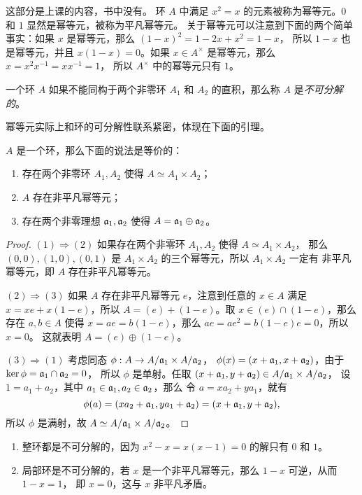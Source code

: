 这部分是上课的内容，书中没有。
环 $A$ 中满足 $x^2=x$ 的元素被称为幂等元。$0$ 和 $1$ 显然是幂等元，被称为平凡幂等元。
关于幂等元可以注意到下面的两个简单事实：如果 $x$ 是幂等元，那么 $(1-x)^2=1-2x+x^2=1-x$，
所以 $1-x$ 也是幂等元，并且 $x(1-x)=0$。如果 $x\in A^\times$ 是幂等元，那么 $x=x^2x^{-1}=xx^{-1}=1$，
所以 $A^\times$ 中的幂等元只有 $1$。

\begin{definition}
  一个环 $A$ 如果不能同构于两个非零环 $A_1$ 和 $A_2$ 的直积，那么称
  $A$ 是\emph{不可分解的}。
\end{definition}

幂等元实际上和环的可分解性联系紧密，体现在下面的引理。

\begin{lemma}
  $A$ 是一个环，那么下面的说法是等价的：
  \begin{enumerate}
    \item 存在两个非零环 $A_1,A_2$ 使得 $A\simeq A_1\times A_2$；
    \item $A$ 存在非平凡幂等元；
    \item 存在两个非零理想 $\mathfrak{a}_1,\mathfrak{a}_2$ 使得 $A=\mathfrak{a}_1\oplus\mathfrak{a}_2$。
  \end{enumerate}
\end{lemma}
\begin{proof}
  $(1)\Rightarrow (2)$ 如果存在两个非零环 $A_1,A_2$ 使得 $A\simeq A_1\times A_2$，
  那么 $(0,0),(1,0),(0,1)$ 是 $A_1\times A_2$ 的三个幂等元，所以 $A_1\times A_2$ 一定有
  非平凡幂等元，即 $A$ 存在非平凡幂等元。

  $(2)\Rightarrow (3)$ 如果 $A$ 存在非平凡幂等元 $e$，注意到任意的 $x\in A$ 满足
  $x=xe+x(1-e)$，所以 $A=(e)+(1-e)$。取 $x\in (e)\cap (1-e)$，那么存在
  $a,b\in A$ 使得 $x=ae=b(1-e)$，那么 $ae=ae^2=b(1-e)e=0$，所以 $x=0$。
  这就表明 $A=(e)\oplus (1-e)$。

  $(3)\Rightarrow (1)$ 考虑同态 $\phi:A\to A/\mathfrak{a}_1\times A/\mathfrak{a}_2$，
  $\phi(x)=(x+\mathfrak{a}_1,x+\mathfrak{a}_2)$，由于 $\ker\phi=\mathfrak{a}_1\cap\mathfrak{a}_2=0$，
  所以 $\phi$ 是单射。任取 $(x+\mathfrak{a}_1,y+\mathfrak{a}_2)\in A/\mathfrak{a}_1\times A/\mathfrak{a}_2$，
  设 $1=a_1+a_2$，其中 $a_1\in \mathfrak{a}_1,a_2\in\mathfrak{a}_2$，那么
  令 $a=xa_2+ya_1$，就有
  \[
    \phi(a)=(xa_2+\mathfrak{a}_1,ya_1+\mathfrak{a}_2)  
    =(x+\mathfrak{a}_1,y+\mathfrak{a}_2),
  \]
  所以 $\phi$ 是满射，故 $A\simeq A/\mathfrak{a}_1\times A/\mathfrak{a}_2$。
\end{proof}

\begin{example}
  \mbox{}
  \begin{enumerate}
    \item 整环都是不可分解的，因为 $x^2-x=x(x-1)=0$ 的解只有 $0$ 和 $1$。
    \item 局部环是不可分解的，若 $x$ 是一个非平凡幂等元，那么 $1-x$ 可逆，从而 $1-x=1$，
    即 $x=0$，这与 $x$ 非平凡矛盾。
  \end{enumerate}
\end{example}



